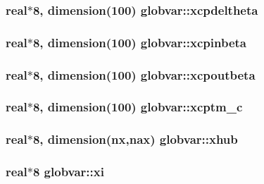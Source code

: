 \subsubsection[{xcpdeltheta}]{\setlength{\rightskip}{0pt plus 5cm}real$\ast$8, dimension(100) globvar\+::xcpdeltheta}\label{namespaceglobvar_a53a66282b3eaeda7202704473994f279}
\hypertarget{namespaceglobvar_ade9c76fcb375c4e5d05a6d9c04c1dbfe}{}
\subsubsection[{xcpinbeta}]{\setlength{\rightskip}{0pt plus 5cm}real$\ast$8, dimension(100) globvar\+::xcpinbeta}\label{namespaceglobvar_ade9c76fcb375c4e5d05a6d9c04c1dbfe}
\hypertarget{namespaceglobvar_aa9e6a5ee3e0ace429ff2ebc6f8c04ed2}{}
\subsubsection[{xcpoutbeta}]{\setlength{\rightskip}{0pt plus 5cm}real$\ast$8, dimension(100) globvar\+::xcpoutbeta}\label{namespaceglobvar_aa9e6a5ee3e0ace429ff2ebc6f8c04ed2}
\hypertarget{namespaceglobvar_a8553c7b87c906988c811df4d4b810bbf}{}
\subsubsection[{xcptm\+\_\+c}]{\setlength{\rightskip}{0pt plus 5cm}real$\ast$8, dimension(100) globvar\+::xcptm\+\_\+c}\label{namespaceglobvar_a8553c7b87c906988c811df4d4b810bbf}
\hypertarget{namespaceglobvar_a775a153351e6ee6aa485883756a69374}{}
\subsubsection[{xhub}]{\setlength{\rightskip}{0pt plus 5cm}real$\ast$8, dimension({\bf nx},{\bf nax}) globvar\+::xhub}\label{namespaceglobvar_a775a153351e6ee6aa485883756a69374}
\hypertarget{namespaceglobvar_ab4afb7fee7167606b28de64b112f336c}{}
\subsubsection[{xi}]{\setlength{\rightskip}{0pt plus 5cm}real$\ast$8 globvar\+::xi}\label{namespaceglobvar_ab4afb7fee7167606b28de64b112f336c}
\hypertarget{namespaceglobvar_a1ccb279a7cd37dd73fbd7b0e07033e12}{}
